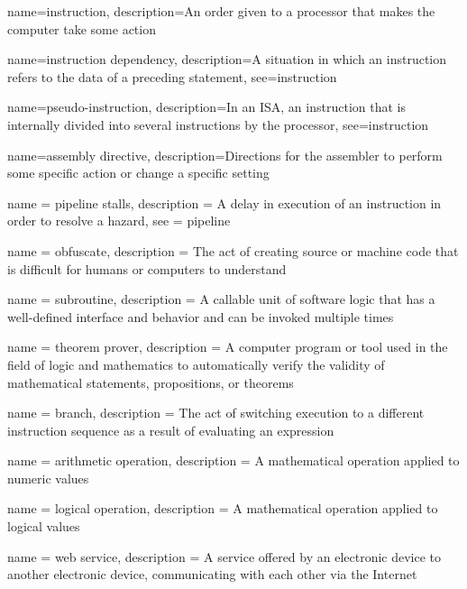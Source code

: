  {
  name={instruction},
  description={An order given to a processor that makes the computer take some action}
}

 {
  name={instruction dependency},
  description={A situation in which an instruction refers to the data of a preceding statement},
  see={instruction}
}

 {
  name={pseudo-instruction},
  description={In an ISA, an instruction that is internally divided into several instructions by the processor},
  see={instruction}
}

 {
  name={assembly directive},
  description={Directions for the assembler to perform some specific action or change a specific setting}
}

 {
  name = {pipeline stalls},
  description = {A delay in execution of an instruction in order to resolve a hazard},
  see = {pipeline}
}


 {
  name = {obfuscate},
  description = {The act of creating source or machine code that is difficult for humans or computers to understand}
}

 {
  name = {subroutine},
  description = {A callable unit of software logic that has a well-defined interface and behavior and can be invoked multiple times}
}

 {
  name = {theorem prover},
  description = {A computer program or tool used in the field of logic and mathematics to automatically verify the validity of mathematical statements, propositions, or theorems}
}

 {
  name = {branch},
  description = {The act of switching execution to a different instruction sequence as a result of evaluating an expression}
}

 {
  name = {arithmetic operation},
  description = {A mathematical operation applied to numeric values}
}

 {
  name = {logical operation},
  description = {A mathematical operation applied to logical values}
}

 {
  name = {web service},
  description = {A service offered by an electronic device to another electronic device, communicating with each other via the Internet}
}

